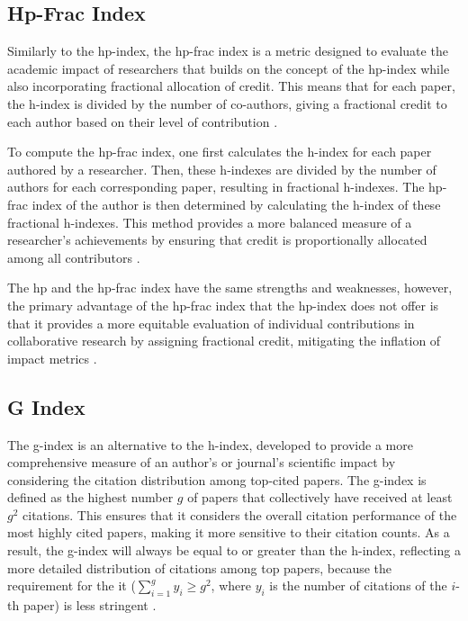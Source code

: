 \subsection{Hp-Frac Index}
Similarly to the hp-index, the hp-frac index is a metric designed to evaluate
the academic impact of researchers that builds on the concept of the hp-index
while also incorporating fractional allocation of credit. This means that for
each paper, the h-index is divided by the number of co-authors, giving a
fractional credit to each author based on their level of contribution
\cite{singhal2023hp}.

To compute the hp-frac index, one first calculates the h-index for each paper
authored by a researcher. Then, these h-indexes are divided by the number of
authors for each corresponding paper, resulting in fractional h-indexes. The
hp-frac index of the author is then determined by calculating the h-index of
these fractional h-indexes. This method provides a more balanced measure of a
researcher's achievements by ensuring that credit is proportionally allocated
among all contributors \cite{singhal2023hp}.

The hp and the hp-frac index have the same strengths and weaknesses, however,
the primary advantage of the hp-frac index that the hp-index does not offer is
that it provides a more equitable evaluation of individual contributions in
collaborative research by assigning fractional credit, mitigating the inflation
of impact metrics \cite{singhal2023hp}.

\subsection{G Index}
The g-index is an alternative to the h-index, developed to provide a more
comprehensive measure of an author's or journal's scientific impact by
considering the citation distribution among top-cited papers. The g-index is
defined as the highest number $g$ of papers that collectively have received at
least $g^2$ citations. This ensures that it considers the overall citation
performance of the most highly cited papers, making it more sensitive to their
citation counts. As a result, the g-index will always be equal to or greater
than the h-index, reflecting a more detailed distribution of citations among
top papers, because the requirement for the it ($\sum_{i=1}^{g} y_i \geq g^2$,
where $y_i$ is the number of citations of the $i$-th paper) is less stringent
\cite{egghe2008mathematical, egghe2006improvement}.

